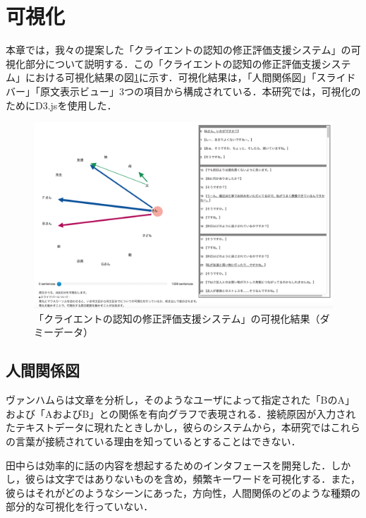 \documentclass[shuuron]{kuee}
\begin{document}

\section{可視化}

本章では，我々の提案した「クライエントの認知の修正評価支援システム」の可視化部分について説明する．この「クライエントの認知の修正評価支援システム」における可視化結果の図\ref{fig:dummyChara}に示す．可視化結果は，「人間関係図」「スライドバー」「原文表示ビュー」3つの項目から構成されている．本研究では，可視化のためにD3.js\cite{vand3}を使用した．%

\begin{figure}
  \begin{center}
    \includegraphics[width=\linewidth]{dummyChara.png}
  \end{center}
  \caption{「クライエントの認知の修正評価支援システム」の可視化結果（ダミーデータ）}
  \label{fig:dummyChara}
\end{figure}

\subsection{人間関係図}

ヴァンハムら\cite{van2009mapping}は文章を分析し，そのようなユーザによって指定された「BのA」および「AおよびB」との関係を有向グラフで表現される．接続原因が入力されたテキストデータに現れたときしかし，彼らのシステムから，本研究ではこれらの言葉が接続されている理由を知っているとすることはできない．

田中ら\cite{tanaka}は効率的に話の内容を想起するためのインタフェースを開発した．しかし，彼らは文字ではありないものを含め，頻繁キーワードを可視化する．また，彼らはそれがどのようなシーンにあった，方向性，人間関係のどのような種類の部分的な可視化を行っていない．
\end{document}
